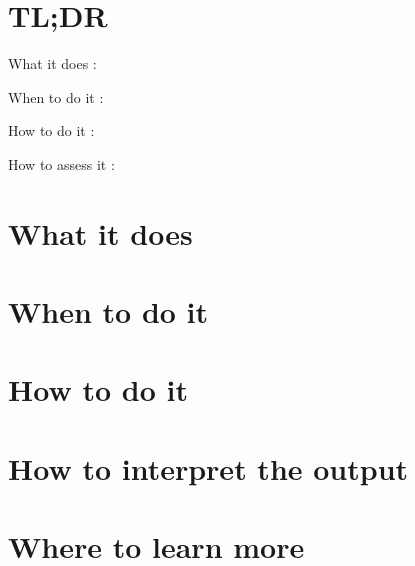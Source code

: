 \documentclass[
]{book}
\begin{document}
\hypertarget{tldr-23}{%
\section{TL;DR}\label{tldr-23}}

What it does
:

When to do it
:

How to do it
:

How to assess it
:

\hypertarget{what-it-does-23}{%
\section{What it does}\label{what-it-does-23}}

\hypertarget{when-to-do-it-23}{%
\section{When to do it}\label{when-to-do-it-23}}

\hypertarget{how-to-do-it-23}{%
\section{How to do it}\label{how-to-do-it-23}}

\hypertarget{how-to-interpret-the-output-23}{%
\section{How to interpret the output}\label{how-to-interpret-the-output-23}}

\hypertarget{where-to-learn-more-23}{%
\section{Where to learn more}\label{where-to-learn-more-23}}

  
\end{document}
